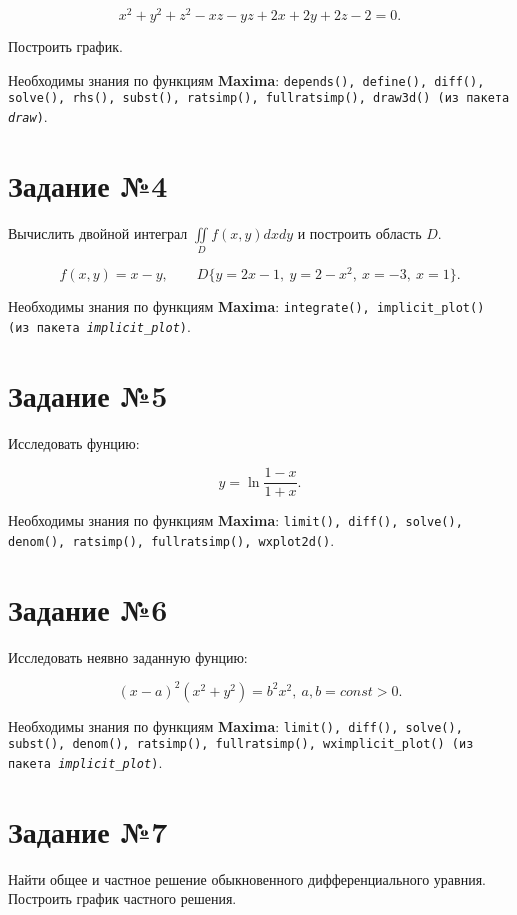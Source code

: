     \[
        x^{2} + y^{2} + z^{2} - x z - y z + 2 x + 2 y + 2 z - 2 = 0.
    \]

    Построить график.

    Необходимы знания по функциям \textbf{Maxima}: {\tt depends(), define(), diff(), solve(), rhs(), subst(), ratsimp(), fullratsimp(), draw3d() (из пакета \textit{draw})}.

\section*{Задание №4}

	Вычислить двойной интеграл $\iint\limits_{D} f(x,y) dx dy$ и построить область $D$.
	
	\[
		f(x,y) = x - y, \qquad D \{ y = 2 x - 1, \: y = 2 - x^{2}, \: x = -3, \: x = 1 \}.
	\]
	
	Необходимы знания по функциям \textbf{Maxima}: {\tt integrate(), implicit\_plot() (из пакета \textit{implicit\_plot})}.

\section*{Задание №5}

    Исследовать фунцию:

    \[
        y = \ln{\frac{1 - x}{1 + x}}.
    \]

    Необходимы знания по функциям \textbf{Maxima}: {\tt limit(), diff(), solve(), denom(), ratsimp(), fullratsimp(), wxplot2d()}.

\section*{Задание №6}

    Исследовать неявно заданную фунцию:

    \[
        \left( x - a \right)^{2} \left( x^{2} + y^{2} \right) = b^{2} x^{2}, \: a, b = const > 0.
    \]

    Необходимы знания по функциям \textbf{Maxima}: {\tt limit(), diff(), solve(), subst(), denom(), ratsimp(), fullratsimp(), wximplicit\_plot() (из пакета \textit{implicit\_plot})}.

\section*{Задание №7}

    Найти общее и частное решение обыкновенного дифференциального уравния. Построить график частного решения.

